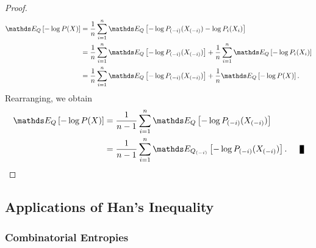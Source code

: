 \documentclass[11pt]{article}
\begin{document}
\begin{itemize}
\begin{proof}
\begin{align*}
\E{Q}{-\log P(X)} &= \frac{1}{n}\sum_{i=1}^{n}\E{Q}{-\log P_{(-i)}(X_{(-i)}) -\log P_i(X_i)} \\
&= \frac{1}{n}\sum_{i=1}^{n}\E{Q}{-\log P_{(-i)}(X_{(-i)})} + \frac{1}{n}\sum_{i=1}^{n}\E{Q}{-\log P_i(X_i)}\\
&= \frac{1}{n}\sum_{i=1}^{n}\E{Q}{-\log P_{(-i)}(X_{(-i)})} + \frac{1}{n}\E{Q}{-\log P(X)}.
\end{align*} Rearranging, we obtain
\begin{align*}
\E{Q}{-\log P(X)} &= \frac{1}{n-1}\sum_{i=1}^{n}\E{Q}{-\log P_{(-i)}(X_{(-i)})}\\
&=\frac{1}{n-1}\sum_{i=1}^{n}\E{Q_{(-i)}}{-\log P_{(-i)}(X_{(-i)})}. \qed
\end{align*}
\end{proof}
\end{itemize}

\subsection{Applications of Han's Inequality}
\subsubsection{Combinatorial Entropies}
\end{document}
